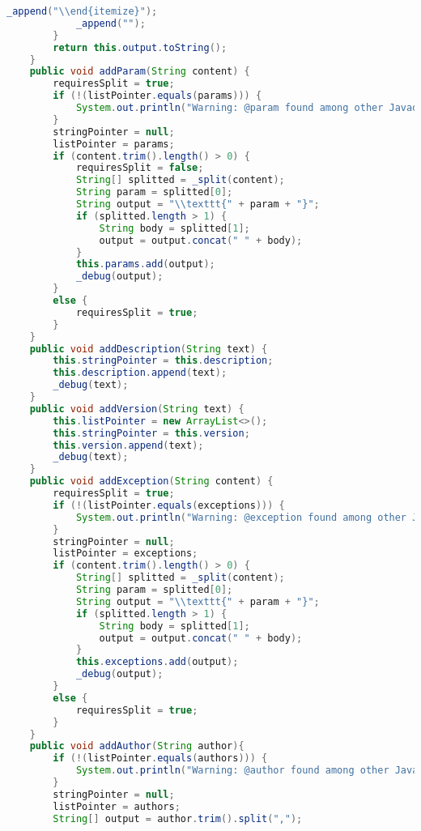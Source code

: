 \begin{lstlisting}[language=Java]
            _append("\\end{itemize}");
            _append("");
        }
        return this.output.toString();
    }
    public void addParam(String content) {
        requiresSplit = true;
        if (!(listPointer.equals(params))) {
            System.out.println("Warning: @param found among other Javadoc keywords.\nYou should put all the paramaters descriptions together.");
        }
        stringPointer = null;
        listPointer = params;
        if (content.trim().length() > 0) {
            requiresSplit = false;
            String[] splitted = _split(content);
            String param = splitted[0];
            String output = "\\texttt{" + param + "}";
            if (splitted.length > 1) {
                String body = splitted[1];
                output = output.concat(" " + body);
            }
            this.params.add(output);
            _debug(output);
        }
        else {
            requiresSplit = true;
        }
    }
    public void addDescription(String text) {
        this.stringPointer = this.description;
        this.description.append(text);
        _debug(text);
    }
    public void addVersion(String text) {
        this.listPointer = new ArrayList<>();
        this.stringPointer = this.version;
        this.version.append(text);
        _debug(text);
    }
    public void addException(String content) {
        requiresSplit = true;
        if (!(listPointer.equals(exceptions))) {
            System.out.println("Warning: @exception found among other Javadoc keywords.\nYou should put all the exceptions descriptions together.");
        }
        stringPointer = null;
        listPointer = exceptions;
        if (content.trim().length() > 0) {
            String[] splitted = _split(content);
            String param = splitted[0];
            String output = "\\texttt{" + param + "}";
            if (splitted.length > 1) {
                String body = splitted[1];
                output = output.concat(" " + body);
            }
            this.exceptions.add(output);
            _debug(output);
        }
        else {
            requiresSplit = true;
        }
    }
    public void addAuthor(String author){
        if (!(listPointer.equals(authors))) {
            System.out.println("Warning: @author found among other Javadoc keywords.\nYou should put all the authors together.");
        }
        stringPointer = null;
        listPointer = authors;
        String[] output = author.trim().split(",");

\end{lstlisting}
